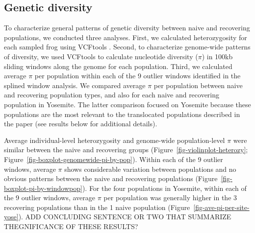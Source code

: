 \documentclass[9pt,twoside,lineno]{pnas-new-SI}
\begin{document}
\hypertarget{genetic-diversity}{%
\subsection{Genetic diversity}\label{genetic-diversity}}

To characterize general patterns of genetic diversity between naive and
recovering populations, we conducted three analyses. First, we
calculated heterozygosity for each sampled frog using VCFtools
\citep{danecek2011}. Second, to characterize genome-wide patterns of
diversity, we used VCFtools to calculate nucleotide diversity (\(\pi\))
in 100kb sliding windows along the genome for each population. Third, we
calculated average \(\pi\) per population within each of the 9 outlier
windows identified in the splined window analysis. We compared average
\(\pi\) per population between naive and recovering population types,
and also for each naive and recovering population in Yosemite. The
latter comparison focused on Yosemite because these populations are the
most relevant to the translocated populations described in the paper
(see results below for additional details).

Average individual-level heterozygosity and genome-wide population-level
\(\pi\) were similar between the naive and recovering groups
(Figure~\ref{fig-violinplot-heterozy};
Figure~\ref{fig-boxplot-genomewide-pi-by-pop}). Within each of the 9
outlier windows, average \(\pi\) shows considerable variation between
populations and no obvious patterns between the naive and recovering
populations (Figure~\ref{fig-boxplot-pi-by-windowpop}). For the four
populations in Yosemite, within each of the 9 outlier windows, average
\(\pi\) per population was generally higher in the 3 recovering
populations than in the 1 naive population
(Figure~\ref{fig-ave-pi-per-site-yose}). ADD CONCLUDING SENTENCE OR
TWO THAT SUMMARIZE THEGNIFICANCE OF THESE RESULTS?

\newpage

\newpage
\end{document}

